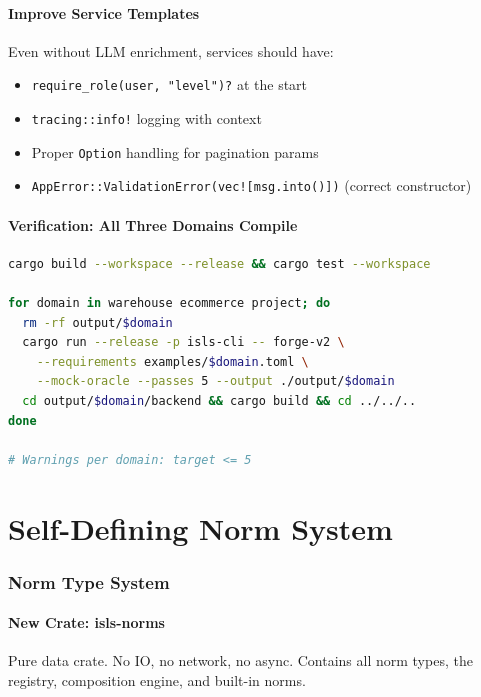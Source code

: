 \documentclass[11pt,a4paper]{article}
\begin{document}
\subsection{Improve Service Templates}

Even without LLM enrichment, services should have:
\begin{itemize}
\item \texttt{require\_role(user, "level")?} at the start
\item \texttt{tracing::info!} logging with context
\item Proper \texttt{Option} handling for pagination params
\item \texttt{AppError::ValidationError(vec![msg.into()])} (correct constructor)
\end{itemize}

\subsection{Verification: All Three Domains Compile}

\begin{lstlisting}[language=bash]
cargo build --workspace --release && cargo test --workspace

for domain in warehouse ecommerce project; do
  rm -rf output/$domain
  cargo run --release -p isls-cli -- forge-v2 \
    --requirements examples/$domain.toml \
    --mock-oracle --passes 5 --output ./output/$domain
  cd output/$domain/backend && cargo build && cd ../../..
done

# Warnings per domain: target <= 5
\end{lstlisting}

\part{Self-Defining Norm System}
\label{part:norms}

\section{Norm Type System}

\subsection{New Crate: isls-norms}

Pure data crate. No IO, no network, no async. Contains all norm
types, the registry, composition engine, and built-in norms.
\end{document}
